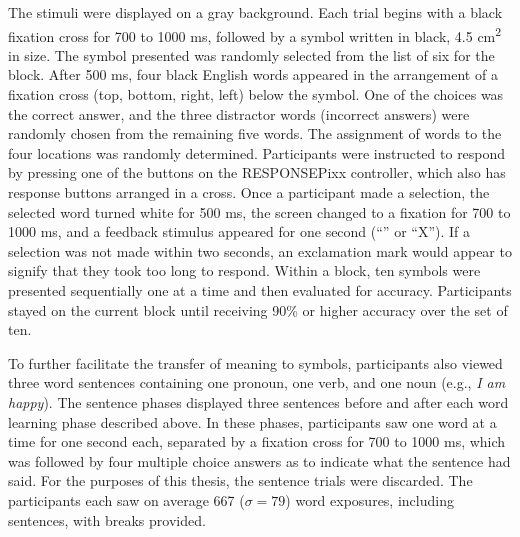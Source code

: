 The stimuli were displayed on a gray background.  Each trial begins with a 
black fixation cross for 700 to 1000 ms, followed by a symbol written in black, 
4.5 cm\textsuperscript{2} in size. The symbol presented was randomly selected 
from the list of six for the block. After 500 ms, four black English words 
appeared in the arrangement of a fixation cross (top, bottom, right, left) 
below the symbol. One of the choices was the correct answer, and the three 
distractor words (incorrect answers) were randomly chosen from the remaining 
five words. The assignment of words to the four locations was randomly 
determined. Participants were instructed to respond by pressing one of the 
buttons on the RESPONSEPixx controller, which also has response buttons 
arranged in a cross. Once a participant made a selection, the selected word 
turned white for 500 ms, the screen changed to a fixation for 700 to 1000 ms, 
and a feedback stimulus appeared for one second (``\CheckmarkBold'' or ``X'').  
If a selection was not made within two seconds, an exclamation mark would 
appear to signify that they took too long to respond. Within a block, ten 
symbols were presented sequentially one at a time and then evaluated for 
accuracy. Participants stayed on the current block until receiving 90\% or 
higher accuracy over the set of ten.
  
To further facilitate the transfer of meaning to symbols, participants also 
viewed three word sentences containing one pronoun, one verb, and one noun 
(e.g., \emph{I am happy}). The sentence phases displayed three sentences before 
and after each word learning phase described above. In these phases, 
participants saw one word at a time for one second each, separated by a 
fixation cross for 700 to 1000 ms, which was followed by four multiple choice 
answers as to indicate what the sentence had said. For the purposes of this 
thesis, the sentence trials were discarded. The participants each saw on 
average 667 ($\sigma = 79$) word exposures, including sentences, with breaks 
provided.
